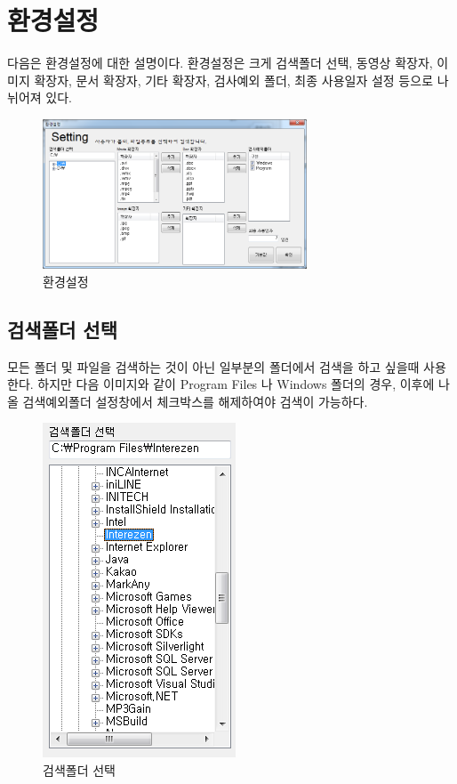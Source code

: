 \documentclass[letterpaper, 11pt]{article} %
\begin{document}
	\section{환경설정}
	다음은 환경설정에 대한 설명이다.	환경설정은 크게 검색폴더 선택, 동영상 확장자, 이미지 확장자, 문서 확장자, 기타 확장자, 검사예외 폴더, 최종 사용일자 설정 등으로 나뉘어져 있다.
	
	\begin{figure}[h]
		\centering
		\includegraphics[width=0.7\textwidth]{Figures/Setting}
		\caption{환경설정}
		\label{fig:setting}
	\end{figure}

	\subsection{검색폴더 선택}
	모든 폴더 및 파일을 검색하는 것이 아닌 일부분의 폴더에서 검색을 하고 싶을때 사용한다. 하지만 다음 이미지와 같이 Program Files 나 Windows 폴더의 경우, 이후에 나올 검색예외폴더 설정창에서 체크박스를 해제하여야 검색이 가능하다.
	
	\begin{figure}[h]
		\centering
		\includegraphics[height=0.35\textheight]{Figures/searchfolder}
		\caption{검색폴더 선택}
		\label{fig:searchfolder}
	\end{figure}
	
\end{document}
